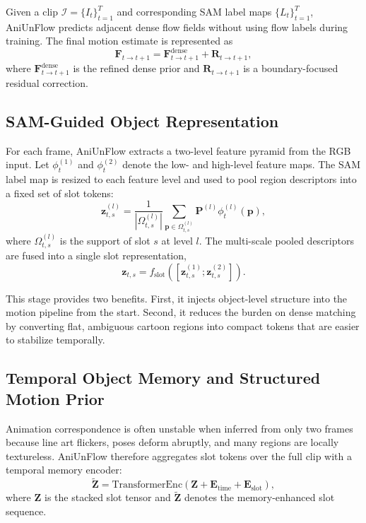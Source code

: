 Given a clip $\mathcal{I}=\{I_t\}_{t=1}^{T}$ and corresponding SAM label maps $\{L_t\}_{t=1}^{T}$, AniUnFlow predicts adjacent dense flow fields without using flow labels during training. The final motion estimate is represented as
\begin{equation}
\mathbf{F}_{t\rightarrow t+1} = \mathbf{F}^{\mathrm{dense}}_{t\rightarrow t+1} + \mathbf{R}_{t\rightarrow t+1},
\end{equation}
where $\mathbf{F}^{\mathrm{dense}}_{t\rightarrow t+1}$ is the refined dense prior and $\mathbf{R}_{t\rightarrow t+1}$ is a boundary-focused residual correction.

\subsection{SAM-Guided Object Representation}

For each frame, AniUnFlow extracts a two-level feature pyramid from the RGB input. Let $\phi_t^{(1)}$ and $\phi_t^{(2)}$ denote the low- and high-level feature maps. The SAM label map is resized to each feature level and used to pool region descriptors into a fixed set of slot tokens:
\begin{equation}
\mathbf{z}_{t,s}^{(l)} = \frac{1}{|\Omega_{t,s}^{(l)}|} \sum_{\mathbf{p} \in \Omega_{t,s}^{(l)}} \mathbf{P}^{(l)}\phi_t^{(l)}(\mathbf{p}),
\end{equation}
where $\Omega_{t,s}^{(l)}$ is the support of slot $s$ at level $l$. The multi-scale pooled descriptors are fused into a single slot representation,
\begin{equation}
\mathbf{z}_{t,s} = f_{\mathrm{slot}}\!\left([\mathbf{z}_{t,s}^{(1)};\mathbf{z}_{t,s}^{(2)}]\right).
\end{equation}

This stage provides two benefits. First, it injects object-level structure into the motion pipeline from the start. Second, it reduces the burden on dense matching by converting flat, ambiguous cartoon regions into compact tokens that are easier to stabilize temporally.

\subsection{Temporal Object Memory and Structured Motion Prior}

Animation correspondence is often unstable when inferred from only two frames because line art flickers, poses deform abruptly, and many regions are locally textureless. AniUnFlow therefore aggregates slot tokens over the full clip with a temporal memory encoder:
\begin{equation}
\widetilde{\mathbf{Z}} = \mathrm{TransformerEnc}(\mathbf{Z} + \mathbf{E}_{\mathrm{time}} + \mathbf{E}_{\mathrm{slot}}),
\end{equation}
where $\mathbf{Z}$ is the stacked slot tensor and $\widetilde{\mathbf{Z}}$ denotes the memory-enhanced slot sequence.

